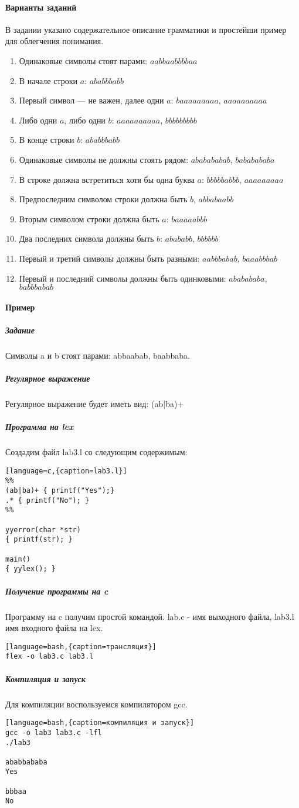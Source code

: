 \documentclass[a4paper,12pt]{article}
\begin{document}
\paragraph{Варианты заданий}
В задании указано содержательное описание грамматики и простейши пример для облегчения понимания.
\begin{enumerate}
	\item Одинаковые символы стоят парами: $aabbaabbbbaa$
	\item В начале строки $a$: $ababbbabb$
	\item Первый символ — не важен, далее одни $a$: $baaaaaaaaa$, $aaaaaaaaaa$
	\item Либо одни $a$, либо одни $b$: $aaaaaaaaaa$, $bbbbbbbbb$
	\item В конце строки $b$: $ababbbabb$
	\item Одинаковые символы не должны стоять рядом: $ababababab$, $bababababa$
	\item В строке должна встретиться хотя бы одна буква $a$: $bbbbbabbb$, $aaaaaaaaa$
	\item Предпоследним символом строки должна быть $b$, $abbabaabb$
	\item Вторым символом строки должна быть $a$: $baaaaabbb$
	\item Два последних символа должны быть $b$: $abababb$, $bbbbbb$
	\item Первый и третий символы должны быть разными: $aabbbabab$, $baaabbbab$
	\item Первый и последний символы должны быть одинковыми: $ababababa$, $babbbabab$
\end{enumerate}

\paragraph{Пример}
\subparagraph{Задание}
Символы a и b стоят парами: abbaabab, baabbaba.
\subparagraph{Регулярное выражение}
Регулярное выражение будет иметь вид: (ab|ba)+

\subparagraph{Программа на lex}
Создадим файл lab3.l со следующим содержимым:
\begin{lstlisting}[language=c,{caption=lab3.l}]
%%
(ab|ba)+ { printf("Yes");}
.* { printf("No"); }
%%

yyerror(char *str)
{ printf(str); }

main()
{ yylex(); }
\end{lstlisting}

\subparagraph{Получение программы на c}
Программу на c получим простой командой. lab.c - имя выходного файла, lab3.l имя входного файла на lex.
\begin{lstlisting}[language=bash,{caption=трансляция}]
flex -o lab3.c lab3.l
\end{lstlisting}

\subparagraph{Компиляция и запуск}
Для компиляции воспользуемся компилятором gcc.
\begin{lstlisting}[language=bash,{caption=компиляция и запуск}]
gcc -o lab3 lab3.c -lfl
./lab3

ababbababa
Yes

bbbaa
No	
\end{lstlisting}
\end{document}
